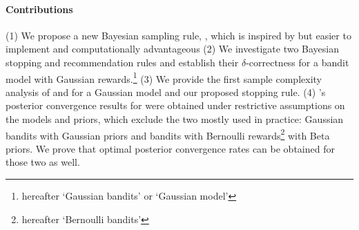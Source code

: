 % 


\paragraph{Contributions} %
(1) We propose a new Bayesian sampling rule, \TCC, which is inspired by \TTTS but easier to implement and computationally advantageous (2) We investigate two Bayesian stopping and recommendation rules and establish their $\delta$-correctness for a bandit model with Gaussian rewards.\footnote{hereafter `Gaussian bandits' or `Gaussian model'} (3) We provide the first sample complexity analysis of \TTTS and \TCC for a Gaussian model and our proposed stopping rule. (4) \citeauthor{russo2016ttts}'s posterior convergence results for \TTTS were obtained under restrictive assumptions on the models and priors, which exclude the two mostly used in practice: Gaussian bandits with Gaussian priors and bandits with Bernoulli rewards\footnote{hereafter `Bernoulli bandits'} with Beta priors. We prove that optimal posterior convergence rates can be obtained for those two as well.

